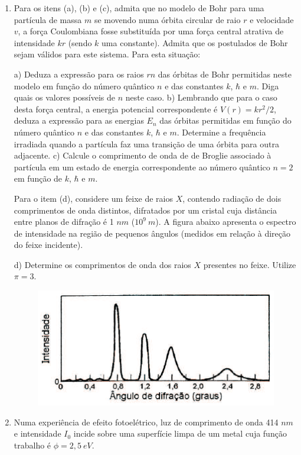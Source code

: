 \begin{enumerate}[start=1,label={\bfseries Q\arabic*.}]
\item Para os itens (a), (b) e (c), admita que no modelo de Bohr para uma partícula de massa $m$ se movendo numa órbita circular de raio $r$ e velocidade $v$, a força Coulombiana fosse substituída por uma força central atrativa de intensidade $kr$ (sendo $k$ uma constante). Admita que os postulados de Bohr sejam válidos para este sistema. Para esta situação:

a) Deduza a expressão para os raios $rn$ das órbitas de Bohr permitidas neste modelo em função do número quântico $n$ e das constantes $k$, $\hbar$ e $m$. Diga quais os valores possíveis de $n$ neste caso.
b) Lembrando que para o caso desta força central, a energia potencial correspondente é $V (r) = kr^{2}/2$, deduza a expressão para as energias $E_{n}$ das órbitas permitidas em função do número quântico $n$ e das constantes $k$, $\hbar$ e $m$. Determine a frequência irradiada quando a partícula faz uma transição de uma órbita para outra adjacente.
c) Calcule o comprimento de onda de de Broglie associado à partícula em um estado de energia correspondente ao número quântico $n = 2$ em função de $k$, $\hbar$ e $m$.

Para o item (d), considere um feixe de raios $X$, contendo radiação de dois comprimentos de onda distintos, difratados por um cristal cuja distância entre planos de difração é 1 $nm$ ($10^{9} \ m$). A figura abaixo apresenta o espectro de intensidade na região de pequenos ângulos (medidos em relação à direção do feixe incidente).

d) Determine os comprimentos de onda dos raios $X$ presentes no feixe. Utilize $\pi = 3$.

\begin{figure}[H]
  \centering
  \includegraphics[scale=0.8]{moderna-img/difracao.png}
\end{figure}


\item Numa experiência de efeito fotoelétrico, luz de comprimento de onda 414 $nm$ e intensidade $I_{0}$ incide sobre uma superfície limpa de um metal cuja função trabalho é $\phi = 2,5 \ eV$.


\end{enumerate}
